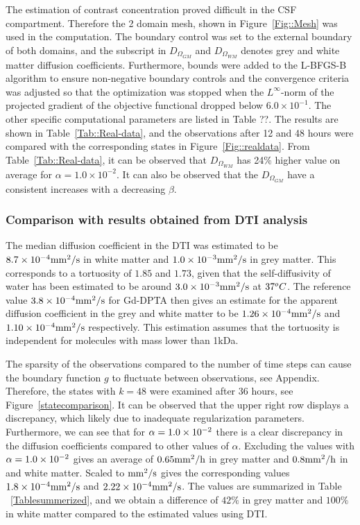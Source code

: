 \documentclass[12pt,a4paper]{article}
\begin{document}
The estimation of contrast concentration proved difficult in the CSF compartment. Therefore the 2 domain mesh, shown in Figure~\ref{Fig::Mesh} was used in the computation. The boundary control was set to the external boundary of both domains, and the subscript in $D_{\Omega_{GM}}$ and $D_{\Omega_{WM}}$ denotes grey and white matter diffusion coefficients. Furthermore, bounds were added to the L-BFGS-B algorithm to ensure non-negative boundary controls and the convergence criteria was adjusted so that the optimization was stopped when the $L^\infty$-norm of the projected gradient of the objective functional dropped below $6.0\times 10^{-1}$. The other specific  computational parameters are listed in Table ??.
The results are shown in Table~\ref{Tab::Real-data}, and the observations after 12 and 48 hours were compared with the corresponding states in Figure~\ref{Fig::realdata}. From Table~\ref{Tab::Real-data}, it can be observed that $D_{\Omega_{WM}}$ has 24\% higher value on average for $\alpha =1.0\times 10^{-2}$. It can also be observed that the $D_{\Omega_{GM}}$ have a consistent increases with a decreasing $\beta$.

\subsubsection{Comparison with results obtained from DTI analysis}
The median diffusion coefficient in the DTI was estimated to be 
$8.7\times 10\sp{-4} \mathrm{mm\sp{2}/s}$ 
in white matter and 
$1.0\times 10\sp{-3} \mathrm{mm\sp{2}/s}$ 
in grey matter. This corresponds to a tortuosity of $1.85$ and $1.73$, given that the self-diffusivity of water has been estimated to be around $3.0\times 10\sp{-3}\mathrm{mm\sp{2}/s}$ at $37\sp{o}C$. The reference value $3.8\times 10\sp{-4} \mathrm{mm\sp{2}/s}$ for Gd-DPTA then gives an estimate for the apparent diffusion coefficient in the grey and white matter to  be $ 1.26\times 10\sp{-4}\mathrm{mm\sp{2}/s}$ and $1.10\times 10\sp{-4} \mathrm{mm\sp{2}/s}$ respectively. This estimation assumes that the tortuosity is independent for molecules with mass lower than 1kDa. 

The sparsity of the observations compared to the number of time steps can cause the boundary function $g$ to fluctuate between observations, see Appendix. Therefore, the states with $k=48$ were examined after 36 hours, see Figure~\ref{statecomparison}. It can be observed that the upper right row displays a discrepancy, which likely due to inadequate regularization parameters. Furthermore, we can see that for $\alpha=1.0\times 10\sp{-2}$ there is a clear discrepancy in the diffusion coefficients compared to other values of $\alpha$. Excluding the values with $\alpha=1.0\times 10\sp{-2}$ gives an average of $ 0.65 \mathrm{mm\sp{2}/h}$ in grey matter and $ 0.8 \mathrm{mm\sp{2}/h}$ in and white matter. Scaled to $\mathrm{mm\sp{2}/s}$ gives the corresponding values $1.8\times 10\sp{-4}\mathrm{mm\sp{2}/s}$ and $2.22\times 10\sp{-4} \mathrm{mm\sp{2}/s}$. The values are summarized in Table ~\ref{Tablesummerized}, and we obtain a difference of $42\%$ in grey matter and $ 100 \%$ in white matter compared to the estimated values using DTI.
\end{document}
